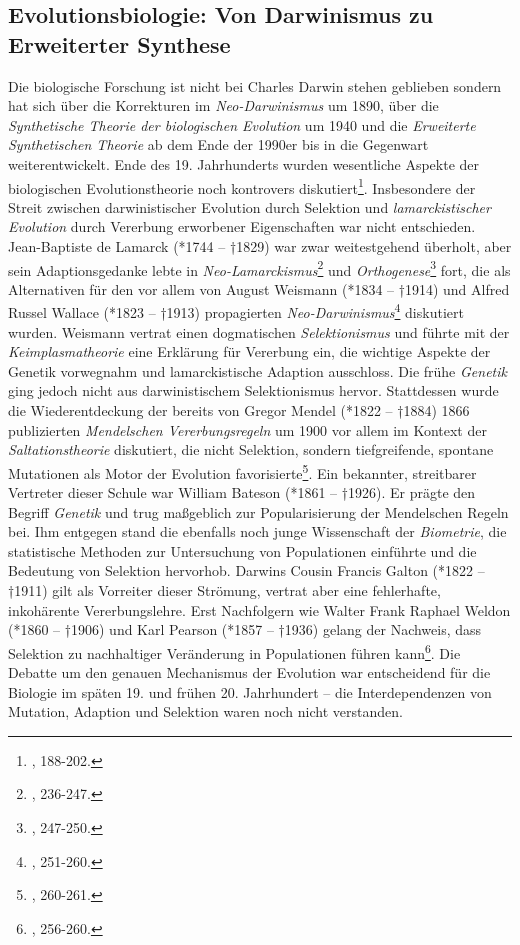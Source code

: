 \documentclass[openany,twoside,twocolumn]{book}
\let\rmarkdownfootnote\footnote%
\def\footnote{\protect\rmarkdownfootnote}
\begin{document}
\hypertarget{biology}{%
\subsection{Evolutionsbiologie: Von Darwinismus zu Erweiterter Synthese}\label{biology}}

Die biologische Forschung ist nicht bei Charles Darwin stehen geblieben sondern hat sich über die Korrekturen im \emph{Neo-Darwinismus} um 1890, über die \emph{Synthetische Theorie der biologischen Evolution} um 1940 und die \emph{Erweiterte Synthetischen Theorie} ab dem Ende der 1990er bis in die Gegenwart weiterentwickelt. Ende des 19. Jahrhunderts wurden wesentliche Aspekte der biologischen Evolutionstheorie noch kontrovers diskutiert\footnote{\textcite{bowler_evolution_1989}, 188-202.}. Insbesondere der Streit zwischen darwinistischer Evolution durch Selektion und \emph{lamarckistischer Evolution} durch Vererbung erworbener Eigenschaften war nicht entschieden. Jean-Baptiste de Lamarck (*1744 -- †1829) war zwar weitestgehend überholt, aber sein Adaptionsgedanke lebte in \emph{Neo-Lamarckismus}\footnote{\textcite{bowler_evolution_1989}, 236-247.} und \emph{Orthogenese}\footnote{\textcite{bowler_evolution_1989}, 247-250.} fort, die als Alternativen für den vor allem von August Weismann (*1834 -- †1914) und Alfred Russel Wallace (*1823 -- †1913) propagierten \emph{Neo-Darwinismus}\footnote{\textcite{bowler_evolution_1989}, 251-260.} diskutiert wurden. Weismann vertrat einen dogmatischen \emph{Selektionismus} und führte mit der \emph{Keimplasmatheorie} eine Erklärung für Vererbung ein, die wichtige Aspekte der Genetik vorwegnahm und lamarckistische Adaption ausschloss. Die frühe \emph{Genetik} ging jedoch nicht aus darwinistischem Selektionismus hervor. Stattdessen wurde die Wiederentdeckung der bereits von Gregor Mendel (*1822 -- †1884) 1866 publizierten \emph{Mendelschen Vererbungsregeln} um 1900 vor allem im Kontext der \emph{Saltationstheorie} diskutiert, die nicht Selektion, sondern tiefgreifende, spontane Mutationen als Motor der Evolution favorisierte\footnote{\textcite{bowler_evolution_1989}, 260-261.}. Ein bekannter, streitbarer Vertreter dieser Schule war William Bateson (*1861 -- †1926). Er prägte den Begriff \emph{Genetik} und trug maßgeblich zur Popularisierung der Mendelschen Regeln bei. Ihm entgegen stand die ebenfalls noch junge Wissenschaft der \emph{Biometrie}, die statistische Methoden zur Untersuchung von Populationen einführte und die Bedeutung von Selektion hervorhob. Darwins Cousin Francis Galton (*1822 -- †1911) gilt als Vorreiter dieser Strömung, vertrat aber eine fehlerhafte, inkohärente Vererbungslehre. Erst Nachfolgern wie Walter Frank Raphael Weldon (*1860 -- †1906) und Karl Pearson (*1857 -- †1936) gelang der Nachweis, dass Selektion zu nachhaltiger Veränderung in Populationen führen kann\footnote{\textcite{bowler_evolution_1989}, 256-260.}. Die Debatte um den genauen Mechanismus der Evolution war entscheidend für die Biologie im späten 19. und frühen 20. Jahrhundert -- die Interdependenzen von Mutation, Adaption und Selektion waren noch nicht verstanden.
\end{document}
